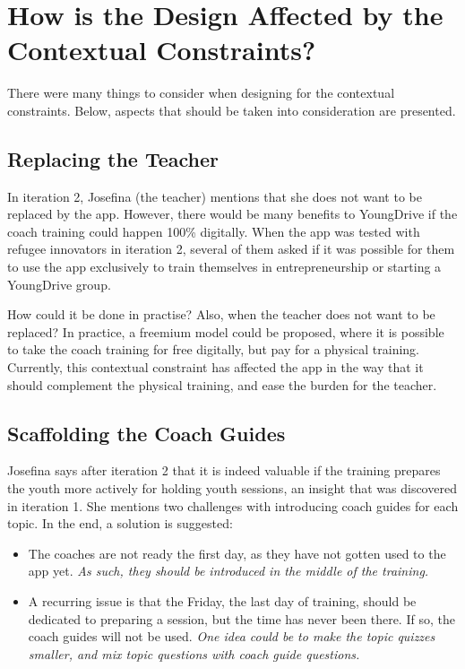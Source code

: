 \section{How is the Design Affected by the Contextual Constraints?}

There were many things to consider when designing for the contextual constraints. Below, aspects that should be taken into consideration are presented.

\subsection{Replacing the Teacher}
In iteration 2, Josefina (the teacher) mentions that she does not want to be replaced by the app. However, there would be many benefits to YoungDrive if the coach training could happen 100\% digitally. When the app was tested with refugee innovators in iteration 2, several of them asked if it was possible for them to use the app exclusively to train themselves in entrepreneurship or starting a YoungDrive group.

How could it be done in practise? Also, when the teacher does not want to be replaced? In practice, a freemium model could be proposed, where it is possible to take the coach training for free digitally, but pay for a physical training. Currently, this contextual constraint has affected the app in the way that it should complement the physical training, and ease the burden for the teacher.

\subsection{Scaffolding the Coach Guides}
Josefina says after iteration 2 that it is indeed valuable if the training prepares the youth more actively for holding youth sessions, an insight that was discovered in iteration 1. She mentions two challenges with introducing coach guides for each topic. In the end, a solution is suggested:

\begin{itemize}
\item The coaches are not ready the first day, as they have not gotten used to the app yet. \textit{As such, they should be introduced in the middle of the training.}
\item A recurring issue is that the Friday, the last day of training, should be dedicated to preparing a session, but the time has never been there. If so, the coach guides will not be used. \textit{One idea could be to make the topic quizzes smaller, and mix topic questions with coach guide questions.}
\end{itemize}

